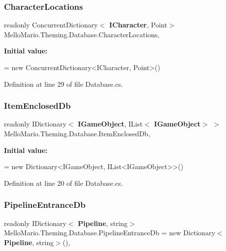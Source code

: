 \subsubsection{Character\+Locations}
{\footnotesize\ttfamily readonly Concurrent\+Dictionary$<$\textbf{ I\+Character}, Point$>$ Mello\+Mario.\+Theming.\+Database.\+Character\+Locations\hspace{0.3cm}{\ttfamily [static]}, {\ttfamily [private]}}

{\bfseries Initial value\+:}
\begin{DoxyCode}
=
            \textcolor{keyword}{new} ConcurrentDictionary<ICharacter, Point>()
\end{DoxyCode}


Definition at line 29 of file Database.\+cs.

\mbox{\label{classMelloMario_1_1Theming_1_1Database_a9687d873ea52f2c536a3f33e0b4a8cf0}} 
\subsubsection{Item\+Enclosed\+Db}
{\footnotesize\ttfamily readonly I\+Dictionary$<$\textbf{ I\+Game\+Object}, I\+List$<$\textbf{ I\+Game\+Object}$>$ $>$ Mello\+Mario.\+Theming.\+Database.\+Item\+Enclosed\+Db\hspace{0.3cm}{\ttfamily [static]}, {\ttfamily [private]}}

{\bfseries Initial value\+:}
\begin{DoxyCode}
=
            \textcolor{keyword}{new} Dictionary<IGameObject, IList<IGameObject>>()
\end{DoxyCode}


Definition at line 20 of file Database.\+cs.

\mbox{\label{classMelloMario_1_1Theming_1_1Database_aecaa6acce9c837aa01b8e2714182c7ee}} 
\subsubsection{Pipeline\+Entrance\+Db}
{\footnotesize\ttfamily readonly I\+Dictionary$<$\textbf{ Pipeline}, string$>$ Mello\+Mario.\+Theming.\+Database.\+Pipeline\+Entrance\+Db = new Dictionary$<$\textbf{ Pipeline}, string$>$()\hspace{0.3cm}{\ttfamily [static]}, {\ttfamily [private]}}



